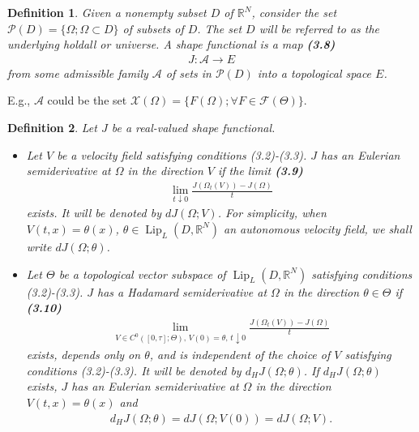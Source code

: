 \documentclass[oneside]{book}
\numberwithin{equation}{section}
\newtheorem{definition}{Definition}[section]
\begin{document}
\begin{definition}
    Given a nonempty subset $D$ of $\mathbb{R}^N$, consider the set $\mathcal{P}(D) = \{\Omega;\Omega\subset D\}$ of subsets of $D$. The set $D$ will be referred to as the underlying \emph{holdall} or \emph{universe}. A \emph{shape functional} is a map \textbf{(3.8)}
    \begin{align*}
        J:\mathcal{A}\to E
    \end{align*}
    from some \emph{admissible family} $\mathcal{A}$ of sets in $\mathcal{P}(D)$ into a topological space $E$.
\end{definition}
E.g., $\mathcal{A}$ could be the set $\mathcal{X}(\Omega) = \{F(\Omega);\forall F\in\mathcal{F}(\Theta)\}$.

\begin{definition}
    Let $J$ be a real-valued shape functional.
    \begin{itemize}
        \item[(i)] Let $V$ be a velocity field satisfying conditions (3.2)-(3.3). $J$ has an \emph{Eulerian semiderivative} at $\Omega$ in the direction $V$ if the limit \textbf{(3.9)}
        \begin{align*}
            \lim_{t\downarrow 0} \frac{J\left(\Omega_t(V)\right) - J(\Omega)}{t}
        \end{align*}
        exists. It will be denoted by $dJ(\Omega;V)$. For simplicity, when $V(t,x) = \theta(x)$, $\theta\in\operatorname{Lip}_L(D,\mathbb{R}^N)$ an autonomous velocity field, we shall write $dJ(\Omega;\theta)$.
        \item[(ii)] Let $\Theta$ be a topological vector subspace of $\operatorname{Lip}_L(D,\mathbb{R}^N)$ satisfying conditions (3.2)-(3.3). $J$ has a \emph{Hadamard semiderivative} at $\Omega$ in the direction $\theta\in\Theta$ if \textbf{(3.10)}
        \begin{align*}
            \lim_{V\in C^0([0,\tau];\Theta),\,V(0) = \theta,\,t\downarrow 0} \frac{J\left(\Omega_t(V)\right) - J(\Omega)}{t}
        \end{align*}
        exists, depends only on $\theta$, and is independent of the choice of $V$ satisfying
        conditions (3.2)-(3.3). It will be denoted by $d_HJ(\Omega;\theta)$. If $d_HJ(\Omega;\theta)$ exists, $J$ has an Eulerian semiderivative at $\Omega$ in the direction $V(t,x) = \theta(x)$ and
        \begin{align*}
            d_HJ(\Omega;\theta) = dJ(\Omega;V(0)) = dJ(\Omega;V).
        \end{align*}

\end{itemize}
\end{definition}
\end{document}
